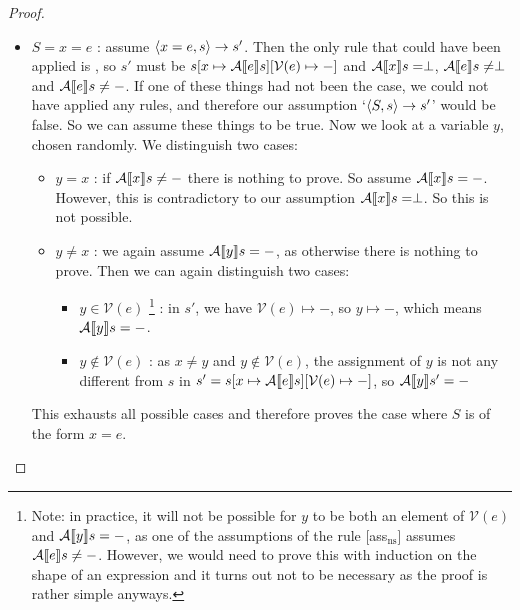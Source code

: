 \begin{proof}
\begin{itemize}[noitemsep]
    \item $S = x = e$ : assume $\langle x = e, s \rangle \to s'$. Then the only rule that could have been applied is \assns, so  $s'$ must be $s[x \mapsto \mathcal{A} \llbracket e \rrbracket s][\mathcal{V}(e)\mapsto-]$ and $\mathcal{A} \llbracket x \rrbracket s = \perp$, $\mathcal{A} \llbracket e \rrbracket s \neq \perp$ and $\mathcal{A} \llbracket e \rrbracket s \neq -$. If one of these things had not been the case, we could not have applied any rules, and therefore our assumption `$\langle S, s \rangle \to s'$' would be false. So we can assume these things to be true. Now we look at a variable $y$, chosen randomly. We distinguish two cases:
    \begin{itemize}[noitemsep]
        \item $y=x$ : if $\mathcal{A} \llbracket x \rrbracket s \not = -$ there is nothing to prove. So assume $\mathcal{A} \llbracket x \rrbracket s = -$. However, this is contradictory to our assumption $\mathcal{A} \llbracket x \rrbracket s = \perp$. So this is not possible.
        \item $y\not = x$ : we again assume $\mathcal{A} \llbracket y \rrbracket s = -$, as otherwise there is nothing to prove. Then we can again distinguish two cases: 
        \begin{itemize}[noitemsep]
            \item $y \in \mathcal{V}(e)$ \footnote{Note: in practice, it will not be possible for $y$ to be both an element of $\mathcal{V}(e)$ and $\mathcal{A} \llbracket y \rrbracket s = -$, as one of the assumptions of the rule [ass$_{\textrm{ns}}$] assumes $\mathcal{A} \llbracket e \rrbracket s \neq -$. However, we would need to prove this with induction on the shape of an expression and it turns out not to be necessary as the proof is rather simple anyways.} : in $s'$, we have $\mathcal{V}(e)\mapsto-$, so $y \mapsto -$, which means $\mathcal{A} \llbracket y \rrbracket s = -$.
            \item $y \not \in \mathcal{V}(e)$ : as $x \not = y$ and $y \not \in \mathcal{V}(e)$, the assignment of $y$ is not any different from $s$ in $s'=s[x \mapsto \mathcal{A} \llbracket e \rrbracket s][\mathcal{V}(e)\mapsto-]$, so $\mathcal{A} \llbracket y \rrbracket s' = -$
        \end{itemize}
    \end{itemize}
    This exhausts all possible cases and therefore proves the case where $S$ is of the form $x = e$.
    

\end{itemize}
\end{proof}
